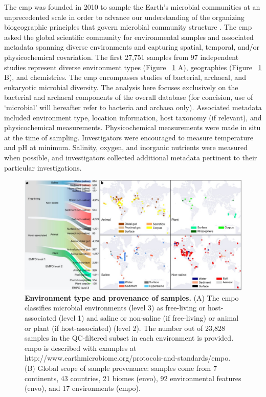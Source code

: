 The \gls{emp} was founded in 2010 to sample the Earth's microbial communities at an
unprecedented scale in order to advance our understanding of the organizing
biogeographic principles that govern microbial community structure
\cite{Gilbert2010, Gilbert2014, Thompson2017}. The \gls{emp} asked the global scientific
community for environmental samples and associated metadata spanning diverse
environments and capturing spatial, temporal, and/or physicochemical covariation.
The first 27,751 samples from 97 independent studies represent diverse environment
types (Figure ~\ref{EMProvenance} A), geographies (Figure ~\ref{EMProvenance} B),
and chemistries. The \gls{emp} encompasses studies of bacterial, archaeal, and
eukaryotic microbial diversity. The analysis here focuses exclusively on the
bacterial and archaeal components of the overall database (for concision, use of
‘microbial’ will hereafter refer to bacteria and archaea only). Associated metadata
included environment type, location information, host taxonomy (if relevant), and
physicochemical measurements. Physicochemical measurements were made in situ at
the time of sampling. Investigators were encouraged to measure temperature and
pH at minimum. Salinity, oxygen, and inorganic nutrients were measured when possible,
and investigators collected additional metadata pertinent to their particular investigations.

\begin{figure}[htbp]
\includegraphics[width=\columnwidth]{chapter_contributions_figures/EMProvenance.pdf}
\caption[Environment type and provenance of samples]{\textbf{Environment type and provenance of samples.}
(A) The \gls{empo} classifies microbial environments (level 3) as free-living or
host-associated (level 1) and saline or non-saline (if free-living) or animal
or plant (if host-associated) (level 2). The number out of 23,828 samples in the
QC-filtered subset in each environment is provided. \gls{empo} is described with examples
at http://www.earthmicrobiome.org/protocols-and-standards/empo. (B) Global scope of
sample provenance: samples come from 7 continents, 43 countries, 21 biomes (\gls{envo}),
92 environmental features (\gls{envo}), and 17 environments (\gls{empo}).}
\label{EMProvenance}
\end{figure}

